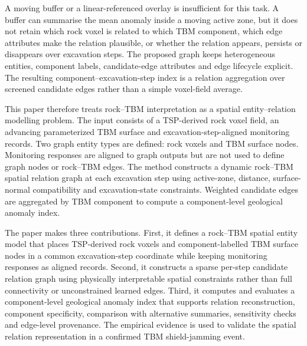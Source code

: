 A moving buffer or a linear-referenced overlay is insufficient for this task. A buffer can summarise the mean anomaly inside a moving active zone, but it does not retain which rock voxel is related to which TBM component, which edge attributes make the relation plausible, or whether the relation appears, persists or disappears over excavation steps. The proposed graph keeps heterogeneous entities, component labels, candidate-edge attributes and edge lifecycle explicit. The resulting component--excavation-step index is a relation aggregation over screened candidate edges rather than a simple voxel-field average.

This paper therefore treats rock--TBM interpretation as a spatial entity--relation modelling problem. The input consists of a TSP-derived rock voxel field, an advancing parameterized TBM surface and excavation-step-aligned monitoring records. Two graph entity types are defined: rock voxels and TBM surface nodes. Monitoring responses are aligned to graph outputs but are not used to define graph nodes or rock--TBM edges. The method constructs a dynamic rock--TBM spatial relation graph at each excavation step using active-zone, distance, surface-normal compatibility and excavation-state constraints. Weighted candidate edges are aggregated by TBM component to compute a component-level geological anomaly index.

The paper makes three contributions. First, it defines a rock--TBM spatial entity model that places TSP-derived rock voxels and component-labelled TBM surface nodes in a common excavation-step coordinate while keeping monitoring responses as aligned records. Second, it constructs a sparse per-step candidate relation graph using physically interpretable spatial constraints rather than full connectivity or unconstrained learned edges. Third, it computes and evaluates a component-level geological anomaly index that supports relation reconstruction, component specificity, comparison with alternative summaries, sensitivity checks and edge-level provenance. The empirical evidence is used to validate the spatial relation representation in a confirmed TBM shield-jamming event.
